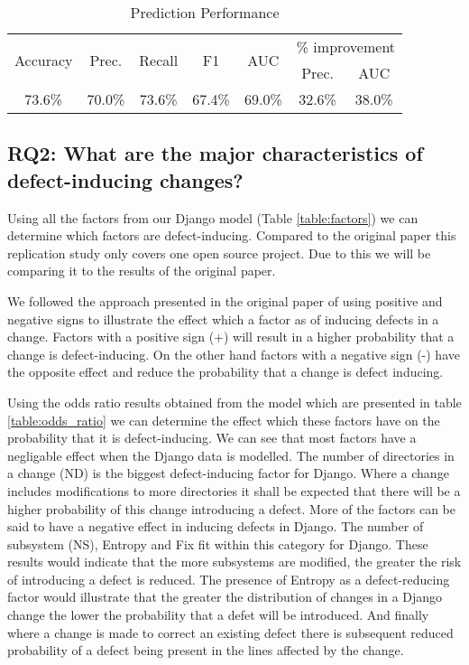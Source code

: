 \documentclass[10pt, conference]{IEEEtran}
\begin{document}
\begin{table}
	\centering
	\caption{Prediction Performance}
	\begin{tabular}{|c|c|c|c|c||c|c|}
		\hline \multirow{2}{*}{Accuracy} & \multirow{2}{*}{Prec.} & \multirow{2}{*}{Recall} & \multirow{2}{*}{F1} & \multirow{2}{*}{AUC} & \multicolumn{2}{|c|}{\% improvement} \\ \cline{6-7} 
		 &  &  &  &  & Prec. & AUC \\  
		\hline 73.6\% & 70.0\% & 73.6\% & 67.4\% & 69.0\% & 32.6\% & 38.0\% \\ 
		\hline 
	\end{tabular}
	
	\label{table:prediction} 
\end{table}


\subsection{RQ2: What are the major characteristics of defect-inducing changes?}
\label{sec:rq2}

Using all the factors from our Django model (Table \ref{table:factors}) we can determine which factors are defect-inducing. Compared to the original paper this replication study only covers one open source project. Due to this we will be comparing it to the results of the original paper. 

We followed the approach presented in the original paper of using positive and negative signs to illustrate the effect which a factor as of inducing defects in a change. Factors with a positive sign (+) will result in a higher probability that a change is defect-inducing. On the other hand factors with a negative sign (-) have the opposite effect and reduce the probability that a change is defect inducing.  

Using the odds ratio results obtained from the model which are presented in table \ref{table:odds_ratio} we can determine the effect which these factors have on the probability that it is defect-inducing.  We can see that most factors have a negligable effect when the Django data is modelled. The number of directories in a change (ND) is the biggest defect-inducing factor for Django. Where a change includes modifications to more directories it shall be expected that there will be a higher probability of this change introducing a defect. More of the factors can be said to have a negative effect in inducing defects in Django. The number of subsystem (NS), Entropy and Fix fit within this category for Django. These results would indicate that the more subsystems are modified, the greater the risk of introducing a defect is reduced. The presence of Entropy as a defect-reducing factor would illustrate that the greater the distribution of changes in a Django change the lower the probability that a defet will be introduced. And finally where a change is made to correct an existing defect there is subsequent reduced probability of a defect being present in the lines affected by the change. 
\end{document}

